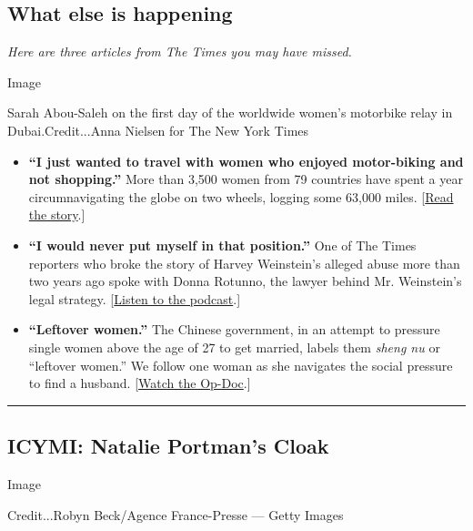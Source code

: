 \hypertarget{what-else-is-happening}{%
\subsection{What else is happening}\label{what-else-is-happening}}

\emph{Here are three articles from The Times you may have missed.}

Image

Sarah Abou-Saleh on the first day of the worldwide women's motorbike
relay in Dubai.Credit...Anna Nielsen for The New York Times

\begin{itemize}
\item
  \textbf{``I just wanted to travel with women who enjoyed motor-biking
  and not shopping.''} More than 3,500 women from 79 countries have
  spent a year circumnavigating the globe on two wheels, logging some
  63,000 miles.
  {[}\href{https://www.nytimes.com/2020/02/09/business/women-riders-world-relay-motorcycles.html}{Read
  the story}.{]}
\item
  \textbf{``I would never put myself in that position.''} One of The
  Times reporters who broke the story of Harvey Weinstein's alleged
  abuse more than two years ago spoke with Donna Rotunno, the lawyer
  behind Mr. Weinstein's legal strategy.
  {[}\href{https://www.nytimes.com/2020/02/07/podcasts/the-daily/weinstein-trial.html}{Listen
  to the podcast}.{]}
\item
  \textbf{``Leftover women.''} The Chinese government, in an attempt to
  pressure single women above the age of 27 to get married, labels them
  \emph{sheng nu} or ``leftover women.'' We follow one woman as she
  navigates the social pressure to find a husband.
  {[}\href{https://www.nytimes.com/2020/02/11/opinion/china-marriage-leftover-women.html}{Watch
  the Op-Doc}.{]}
\end{itemize}

\begin{center}\rule{0.5\linewidth}{\linethickness}\end{center}

\hypertarget{icymi-natalie-portmans-cloak}{%
\subsection{ICYMI: Natalie Portman's
Cloak}\label{icymi-natalie-portmans-cloak}}

Image

Credit...Robyn Beck/Agence France-Presse --- Getty Images

